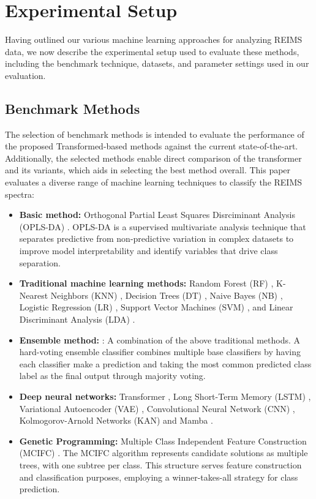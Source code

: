 \section{Experimental Setup}
\label{sec:experimental-setup}

Having outlined our various machine learning approaches for analyzing REIMS data, we now describe the experimental setup used to evaluate these methods, including the benchmark technique, datasets, and parameter settings used in our evaluation.

\subsection{Benchmark Methods}

The selection of benchmark methods is intended to evaluate the performance of the proposed Transformed-based methods against the current state-of-the-art. Additionally, the selected methods enable direct comparison of the transformer and its variants, which aids in selecting the best method overall. This paper evaluates a diverse range of machine learning techniques to classify the REIMS spectra:

\begin{itemize}
    \item \textbf{Basic method:} Orthogonal Partial Least Squares Disrciminant Analysis (OPLS-DA) \citep{Bylesjoe2006}. OPLS-DA is a supervised multivariate analysis technique that separates predictive from non-predictive variation in complex datasets to improve model interpretability and identify variables that drive class separation.
    \item \textbf{Traditional machine learning methods:} Random Forest (RF) \citep{Ho1995}, K-Nearest Neighbors (KNN) \citep{Fix1989}, Decision Trees (DT) \citep{Breiman2017}, Naive Bayes (NB) \citep{Hand2001}, Logistic Regression (LR) \citep{Kleinbaum2002}, Support Vector Machines (SVM) \citep{Cortes1995}, and Linear Discriminant Analysis (LDA) \citep{Balakrishnama1998}.
    \item \textbf{Ensemble method:} \citep{Hansen1990}: A combination of the above traditional methods. A hard-voting ensemble classifier combines multiple base classifiers by having each classifier make a prediction and taking the most common predicted class label as the final output through majority voting.
    \item \textbf{Deep neural networks:} Transformer \citep{Vaswani2017,Devlin2018}, Long Short-Term Memory (LSTM) \citep{Hochreiter1997}, Variational Autoencoder (VAE) \citep{Kingma2013}, Convolutional Neural Network (CNN) \citep{LeCun1989a,LeCun1998}, Kolmogorov-Arnold Networks (KAN) \citep{Liu2024} and Mamba \citep{Gu2023}.
    \item \textbf{Genetic Programming:} Multiple Class Independent Feature Construction (MCIFC) \citep{Tran2016, Tran2019}. The MCIFC algorithm represents candidate solutions as multiple trees, with one subtree per class. This structure serves feature construction and classification purposes, employing a winner-takes-all strategy for class prediction.
\end{itemize}


